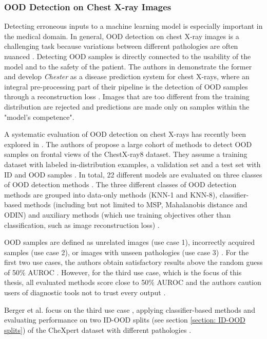 \subsubsection{OOD Detection on Chest X-ray Images}
\label{section: OOD detection on Chest X-ray Images}
Detecting erroneous inputs to a machine learning model is especially important in the medical domain.
In general, OOD detection on chest X-ray images is a challenging task because variations between different pathologies are often nuanced \citep{Salehi2022}.
Detecting OOD samples is directly connected to the usability of the model and to the safety of the patient.
The authors in \citep{Cohen2019} demonstrate the former and develop \textit{Chester} as a disease prediction system for chest X-rays, where an integral pre-processing part of their pipeline is the detection of OOD samples through a reconstruction loss \citep{Dumoulin2017}. 
Images that are too different from the training distribution are rejected \citep{Cohen2019} and predictions are made only on samples within the "model's competence".
\par
A systematic evaluation of OOD detection on chest X-rays has recently been explored in \citep{Cao2020}.
The authors of \citep{Cao2020} propose a large cohort of methods to detect OOD samples on frontal views of the ChestX-ray8 \citep{Wang2017} dataset.
They assume a training dataset with labeled in-distribution examples, a validation set and a test set with ID and OOD samples \citep{Cao2020}.
In total, 22 different models are evaluated on three classes of OOD detection methods \citep{Cao2020}.
The three different classes of OOD detection methods are grouped into data-only methods (KNN-1 and KNN-8), classifier-based methods (including but not limited to MSP, Mahalanobis distance and ODIN) and auxiliary methods (which use training objectives other than classification, such as image reconstruction loss) \citep{Cao2020}.
\par
OOD samples are defined as unrelated images (use case 1), incorrectly acquired samples (use case 2), or images with unseen pathologies (use case 3) \citep{Cao2020}.
For the first two use cases, the authors obtain satisfactory results above the random guess of 50\% AUROC \citep{Cao2020}.
However, for the third use case, which is the focus of this thesis, all evaluated methods score close to 50\% AUROC and the authors caution users of diagnostic tools not to trust every output \citep{Cao2020}.
\par
Berger et al. focus on the third use case \citep{Berger2021}, applying classifier-based methods and evaluating performance on two ID-OOD splits (see section \ref{section: ID-OOD splits}) of the CheXpert dataset \citep{Irvin2019} with different pathologies \citep{Berger2021}.
